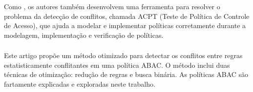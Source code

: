 \subsubsection{}
Como , os autores também desenvolvem uma ferramenta para resolver o problema da detecção de conflitos, chamada  ACPT (Teste de Política de Controle de Acesso), que ajuda a modelar e implementar políticas corretamente durante a modelagem, implementação e verificação de políticas.

\subsubsection{}
Este artigo propõe um método otimizado para detectar os conflitos entre regras estatisticamente conflitantes em uma política ABAC. O método inclui duas técnicas de otimização: redução de regras e busca binária. As políticas ABAC são fartamente explicadas e exploradas neste trabalho.

